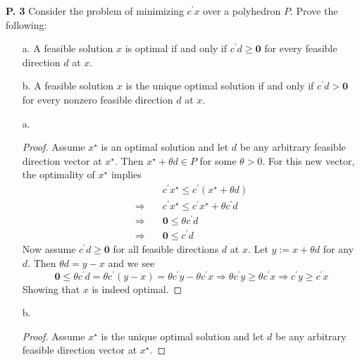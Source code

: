 \documentclass{article}
\begin{document}
\begin{jacklist}
\newpage
    \begin{framed} 
    \item [\textbf{P. 3}] Consider the problem of minimizing $c^{\prime} x$ over a polyhedron $P$. Prove the following:
        \begin{itemize}
            \item [a.] A feasible solution $x$ is optimal if and only if $c^{\prime} d \geq \textbf{0}$ for every feasible direction 
                $d$ at $x$. 
            \item [b.] A feasible solution $x$ is the unique optimal solution if and only if $c^{\prime} d> \textbf{0}$ 
                for every nonzero feasible direction $d$ at $x$. 
        \end{itemize}
    \end{framed}
    \begin{itemize}
        \item [a.] 
            \begin{proof}
                Assume $x^\star$ is an optimal solution and let $d$ be any arbitrary feasible direction vector at $x^\star$.
                Then $x^\star + \theta d \in P$ for some $\theta > 0$. For this new vector, the optimality of $x^\star$ implies 
                \begin{align*}
                    &c^\prime x^\star \leq c^\prime(x^\star + \theta d) \\
                    \Rightarrow \quad &c^\prime x^\star \leq c^\prime x^\star + \theta c^\prime d \\
                    \Rightarrow \quad &\textbf{0} \leq \theta c^\prime d \\
                    \Rightarrow \quad &\textbf{0} \leq c^\prime d
                \end{align*}
                Now assume $c^\prime d \geq \textbf{0}$ for all feasible directions $d$ at $x$. Let $y := x + \theta d$ for any $d$.
                Then $\theta d = y - x$ and we see 
                \[ 
                    \textbf{0} \leq \theta c^\prime d = \theta c^\prime(y-x) = \theta c^\prime y - \theta c^\prime x \Rightarrow 
                    \theta c^\prime y \geq \theta c^\prime x \Rightarrow c^\prime y \geq c^\prime x
                \] 
                Showing that $x$ is indeed optimal.
            \end{proof}
        \item [b.] 
            \begin{proof}
                Assume $x^\star$ is the unique optimal solution and let $d$ be any arbitrary feasible direction vector at $x^\star$.

\end{proof}
\end{itemize}
\end{jacklist}
\end{document}
